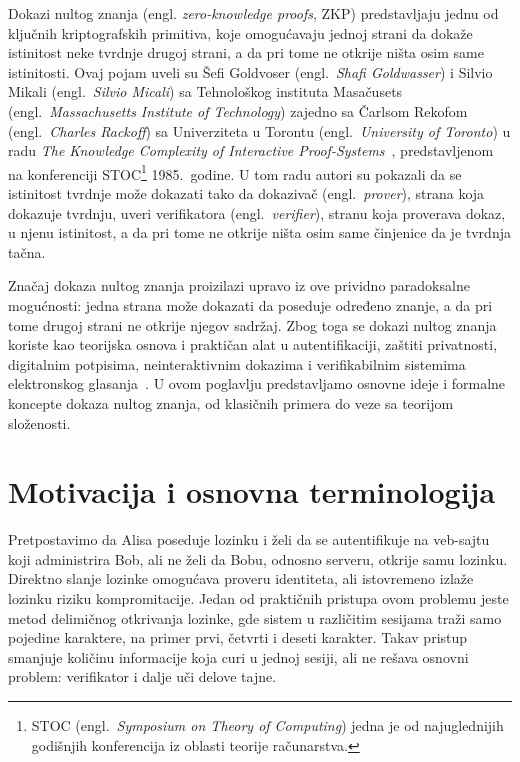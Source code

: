 
Dokazi nultog znanja (engl. \textit{zero-knowledge proofs}, ZKP) predstavljaju jednu od ključnih kriptografskih primitiva,
koje omogućavaju jednoj strani da dokaže istinitost neke tvrdnje drugoj strani, a
da pri tome ne otkrije ništa osim same istinitosti. Ovaj pojam uveli su Šefi
Goldvoser (engl.\ \textit{Shafi Goldwasser}) i Silvio Mikali (engl.\
\textit{Silvio Micali}) sa Tehnološkog instituta Masačusets (engl.\
\textit{Massachusetts Institute of Technology}) zajedno sa Čarlsom Rekofom
(engl.\ \textit{Charles Rackoff}) sa Univerziteta u Torontu (engl.\
\textit{University of Toronto}) u radu \emph{The Knowledge Complexity of
Interactive Proof-Systems}~\cite{goldwasser1985knowledge}, predstavljenom na
konferenciji STOC\footnote{STOC (engl.\ \textit{Symposium on Theory of
Computing}) jedna je od najuglednijih godišnjih konferencija iz oblasti teorije
računarstva.} 1985.\ godine. U tom radu autori su pokazali da se istinitost tvrdnje može dokazati tako
da dokazivač (engl.\ \textit{prover}), strana koja dokazuje tvrdnju,
uveri verifikatora (engl.\ \textit{verifier}), stranu koja proverava dokaz,
u njenu istinitost, a da pri tome ne otkrije ništa osim same činjenice da je
tvrdnja tačna.

Značaj dokaza nultog znanja proizilazi upravo iz ove prividno paradoksalne mogućnosti: 
jedna strana može dokazati da poseduje određeno znanje, a da pri tome drugoj strani ne 
otkrije njegov sadržaj. Zbog toga se dokazi nultog znanja
koriste kao teorijska osnova i praktičan alat u autentifikaciji, zaštiti
privatnosti, digitalnim potpisima, neinteraktivnim dokazima i verifikabilnim
sistemima elektronskog glasanja~\cite{lavin2024survey}. U ovom poglavlju predstavljamo osnovne ideje i formalne koncepte 
dokaza nultog znanja, od klasičnih primera do veze sa teorijom 
složenosti.

\section{Motivacija i osnovna terminologija}

Pretpostavimo da Alisa poseduje lozinku i želi da se autentifikuje na veb-sajtu koji administrira Bob, 
ali ne želi da Bobu, odnosno serveru, otkrije samu lozinku.
Direktno slanje lozinke omogućava proveru identiteta, ali istovremeno izlaže
lozinku riziku kompromitacije. Jedan od praktičnih pristupa ovom problemu jeste metod 
delimičnog otkrivanja lozinke, gde sistem u različitim sesijama traži
samo pojedine karaktere, na primer prvi, četvrti i deseti karakter. Takav
pristup smanjuje količinu informacije koja curi u jednoj sesiji, ali ne rešava
osnovni problem: verifikator i dalje uči delove tajne.

